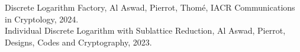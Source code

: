 \documentclass[preview]{standalone}
\begin{document}
Discrete Logarithm Factory, Al Aswad, Pierrot, Thomé, IACR Communications in Cryptology, 2024.\\Individual Discrete Logarithm with Sublattice Reduction, Al Aswad, Pierrot, Designs, Codes and Cryptography, 2023.\\
\end{document}
